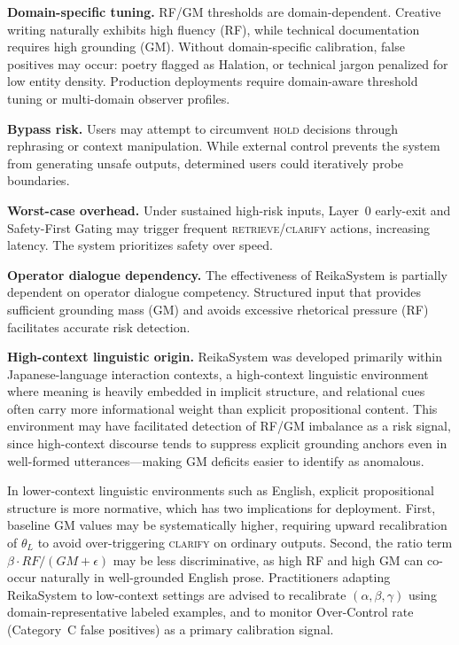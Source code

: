 \documentclass[11pt,a4paper]{article}
\begin{document}
\textbf{Domain-specific tuning.} RF/GM thresholds are domain-dependent. Creative writing
naturally exhibits high fluency (RF), while technical documentation requires high grounding
(GM). Without domain-specific calibration, false positives may occur: poetry flagged as
Halation, or technical jargon penalized for low entity density. Production deployments require
domain-aware threshold tuning or multi-domain observer profiles.

\textbf{Bypass risk.} Users may attempt to circumvent \textsc{hold} decisions through
rephrasing or context manipulation. While external control prevents the system from
generating unsafe outputs, determined users could iteratively probe boundaries.

\textbf{Worst-case overhead.} Under sustained high-risk inputs, Layer~0 early-exit and
Safety-First Gating may trigger frequent \textsc{retrieve}/\textsc{clarify} actions,
increasing latency. The system prioritizes safety over speed.

\textbf{Operator dialogue dependency.} The effectiveness of ReikaSystem is partially
dependent on operator dialogue competency. Structured input that provides sufficient
grounding mass (GM) and avoids excessive rhetorical pressure (RF) facilitates accurate
risk detection.

\textbf{High-context linguistic origin.} ReikaSystem was developed primarily within
Japanese-language interaction contexts, a high-context linguistic environment where meaning
is heavily embedded in implicit structure, and relational cues often carry more informational
weight than explicit propositional content. This environment may have facilitated detection
of RF/GM imbalance as a risk signal, since high-context discourse tends to suppress
explicit grounding anchors even in well-formed utterances---making GM deficits easier
to identify as anomalous.

In lower-context linguistic environments such as English, explicit propositional structure
is more normative, which has two implications for deployment. First, baseline GM values
may be systematically higher, requiring upward recalibration of $\theta_L$ to avoid
over-triggering \textsc{clarify} on ordinary outputs. Second, the ratio term
$\beta \cdot RF/(GM+\epsilon)$ may be less discriminative, as high RF and high GM
can co-occur naturally in well-grounded English prose. Practitioners adapting
ReikaSystem to low-context settings are advised to recalibrate $(\alpha, \beta, \gamma)$
using domain-representative labeled examples, and to monitor Over-Control rate
(Category~C false positives) as a primary calibration signal.
\end{document}
